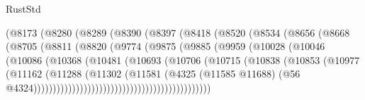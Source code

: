 \begin{lexlean}{RustStd}
\begin{coremodule}
                            (@8173
                              (@8280
                                (@8289
                                  (@8390
                                    (@8397
                                      (@8418
                                        (@8520
                                          (@8534
                                            (@8656
                                              (@8668
                                                (@8705
                                                  (@8811
                                                    (@8820
                                                      (@9774
                                                        (@9875
                                                          (@9885
                                                            (@9959
                                                              (@10028
                                                                (@10046
                                                                  (@10086
                                                                    (@10368
                                                                      (@10481
                                                                        (@10693
                                                                          (@10706
                                                                            (@10715
                                                                              (@10838
                                                                                (@10853
                                                                                  (@10977
                                                                                    (@11162
                                                                                      (@11288
                                                                                        (@11302
                                                                                          (@11581
                                                                                            (@4325
                                                                                              (@11585
                                                                                                @11688)
                                                                                              (@56
                                                                                                @4324))))))))))))))))))))))))))))))))))))))))))))))

\end{coremodule}
\end{lexlean}
